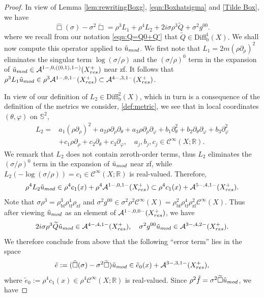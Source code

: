 \documentclass[10pt,a4paper,reqno]{amsart}
\newcommand{\CI}{\mathcal{C}^\infty}
\newcommand{\A}{\mathcal{A}}
\newcommand{\tface}{{\mathrm{tf}}}
\newcommand{\zface}{{\mathrm{zf}}}
\newcommand{\bface}{{\mathrm{bf}}}
\newcommand{\pa}{\partial}
\newcommand{\ti}{\tilde}
\renewcommand{\S}{{\mathbb S}}
\theoremstyle{definition}
\theoremstyle{remark}
\numberwithin{equation}{section}
\newcommand{\R}{\mathbb R}
\newcommand{\cA}{\mathcal A}
\newcommand{\Diffb}{\mathrm{Diff}_\mathrm{b}}
\newcommand{\wh}{\widehat}
\begin{document}
\begin{proof}
In view of Lemma \ref{lem:rewritingBoxg}, \eqref{eqn:Boxhatsigma} and \eqref{Tilde Box}, we have
\[
    \wh\Box(\sigma) - \sigma^2 \widetilde\Box = \rho^3 L_1 + \rho^4 L_2 + 2i\sigma\rho^3 \widetilde{Q} + \sigma^2 g^{00}.
\] where we recall from our notation \eqref{eqn:Q=Q0+Q'} that $\widetilde Q\in\Diffb^1(X).$ %
We shall now compute this operator applied to $\tilde u_{\rm mod}$. We first note that $L_1=2m(\rho\pa_\rho)^2$ eliminates the singular term $\log(\sigma/\rho)$ and the $(\sigma/\rho)^0$ term in the expansion of $\tilde u_{\rm mod}\in \cA^{1-, 0, ( (0,1), 1-)}(X_{\rm res}^+)$ near zf. It follows that $\rho^3 L_1 \tilde u_{\rm mod} \in \rho^3 \cA^{1-, 0, 1-}(X_{\rm res}^+) \subset \cA^{4-, 3, 1-}(X_{\rm res}^+)$.

\noindent
In view of our definition of $L_2\in \Diffb^2(X)$, which in turn is a consequence of the definition of the metrics we consider, \cref*{def:metric}, we see that in local coordinates $(\theta,\varphi)$ on $\S^2$,
\[
\begin{split}
	L_2 = &a_1(\rho\pa_{\rho})^2 + a_2\rho\pa_{\rho} \pa_\theta + a_3 \rho\pa_{\rho} \pa_\varphi + b_1\pa_\theta^2 + b_2\pa_\theta \pa_\varphi + b_3\pa_\varphi^2 \\
	&+ c_1 \rho\pa_{\rho} + c_2 \pa_\theta + c_3\pa_\varphi,\quad a_j, b_j, c_j \in\CI(X;\R).
\end{split}
\]
We remark that $L_2$ does not contain zeroth-order terms, thus $L_2$ eliminates the $(\sigma/\rho)^0$ term in the expansion of $\tilde u_{\rm mod}$ near zf, while $L_2 (-\log(\sigma/\rho)) = c_1\in\CI(X;\R)$ is real-valued.  Therefore,
\[
	\rho^4 L_2 \tilde u_{\rm mod} \in \rho^4 c_1(x) + \rho^4 \A^{1-,0,1-}(X^+_{\rm res}) \subset \rho^4 c_1(x) + \cA^{5-, 4, 1-}(X_{\rm res}^+).
\]
Note that $\sigma\rho^3 = \rho_\bface^3 \rho_\tface^4\rho_\zface$ and $\sigma^2 g^{00}\in \sigma^2\rho^2 \CI(X) = \rho_\bface^2 \rho_\tface^4\rho_\zface^2 \CI(X)$. Thus after viewing $\tilde u_{\rm mod}$ as an element of $\A^{1-, 0, 0-}(X^+_{\rm res})$, we have
\[
	2i\sigma\rho^3\widetilde{Q} \tilde u_{\rm mod} \in \cA^{4-,4,1-}(X_{\rm res}^+),\quad \sigma^2 g^{00}\tilde u_{\rm mod} \in \cA^{3-,4,2-}(X_{\rm res}^+).
\]
We therefore conclude from above that the following ``error term'' lies in the space
\[
    \ti e := (\wh\Box(\sigma) - \sigma^2 \widetilde\Box)\ti u_{\rm mod} \in \ti e_0(x) + \A^{3-,3,1-}(X_{\rm{res}}^+),
\]
where $\ti e_0 := \rho^4 c_1(x) \in \rho^4 \CI(X;\R)$ is real-valued. Since $\rho^2 \ti f= \sigma^2 \widetilde\Box\ti u_{\rm mod}$, we have

\end{proof}
\end{document}
